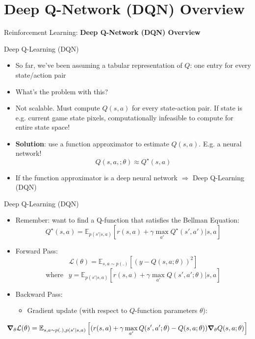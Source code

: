 \section{Deep Q-Network (DQN) Overview}
\begin{frame}{}
    \LARGE Reinforcement Learning: \textbf{Deep Q-Network (DQN) Overview}
\end{frame}

\begin{frame}{Deep Q-Learning (DQN)}
    \begin{itemize}
        \item So far, we’ve been assuming a tabular representation of $Q$: one entry for every state/action pair
        \item What’s the problem with this?
        \pause
        \item Not scalable. Must compute $Q(s,a)$ for every state-action pair. If state is e.g. current game state pixels, computationally infeasible to compute for entire state space!
        \pause
        \item \textbf{Solution}: use a function approximator to estimate $Q(s,a)$. E.g. a neural network!
        $$Q(s,a,; \theta) \approx Q^{\star}(s,a)$$
        \pause
        \item If the function approximator is a deep neural network $\Rightarrow$ Deep Q-Learning (DQN)
    \end{itemize}

\end{frame}

\begin{frame}{Deep Q-Learning (DQN)}
    \begin{itemize}
        \item Remember: want to find a Q-function that satisfies the Bellman Equation:
            $$Q^{\star}(s,a) =  \mathbb{E}_{p(s'|s, a)}\left [r(s,a) + \gamma \max_{a'} Q^{\star}(s',a') | s, a \right ]$$
        \item Forward Pass:
            $$ \mathcal{L}(\theta) = \mathbb{E}_{s,a \sim p(.)}\left[ (y - Q(s,a;\theta))^2 \right ]$$
            $$ \text{where } \:\: y = \mathbb{E}_{p(s'|s, a)}\left [r(s,a) + \gamma \max_{a'} Q(s',a';\theta) | s, a \right ]$$
        \item Backward Pass:
        \begin{itemize}
            \item Gradient update (with respect to $Q$-function parameters $\theta$):
        \end{itemize}
    \end{itemize}

    \begin{changemargin}{-2cm}{-2cm}
        $$\gradient_\theta \mathcal{L}(\theta) = \mathbb{E}_{s,a \sim p(.),p(s'|s, a)}\left [(r(s,a) + \gamma \max_{a'} Q(s',a';\theta) - Q(s,a;\theta)) \gradient_\theta Q(s,a;\theta) \right ]$$
    \end{changemargin}
\end{frame}
